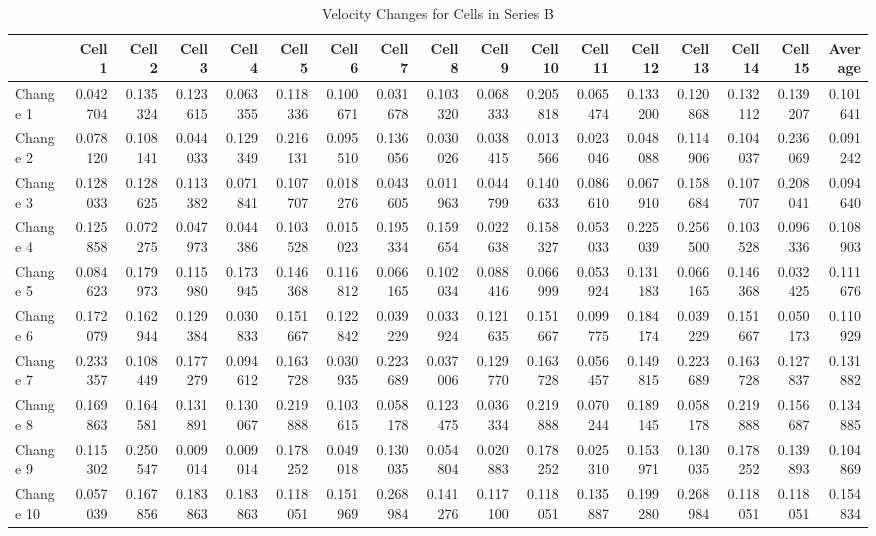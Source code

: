 \documentclass{article}
\begin{document}
\begin{landscape}
\begin{table}[htbp]
\centering
\caption{Velocity Changes for Cells in Series B}
\begin{tabular}{lrrrrrrrrrrrrrrrr}
\toprule
 & Cell 1 & Cell 2 & Cell 3 & Cell 4 & Cell 5 & Cell 6 & Cell 7 & Cell 8 & Cell 9 & Cell 10 & Cell 11 & Cell 12 & Cell 13 & Cell 14 & Cell 15 & Average \\
\midrule
Change 1 & 0.042704 & 0.135324 & 0.123615 & 0.063355 & 0.118336 & 0.100671 & 0.031678 & 0.103320 & 0.068333 & 0.205818 & 0.065474 & 0.133200 & 0.120868 & 0.132112 & 0.139207 & 0.101641 \\
Change 2 & 0.078120 & 0.108141 & 0.044033 & 0.129349 & 0.216131 & 0.095510 & 0.136056 & 0.030026 & 0.038415 & 0.013566 & 0.023046 & 0.048088 & 0.114906 & 0.104037 & 0.236069 & 0.091242 \\
Change 3 & 0.128033 & 0.128625 & 0.113382 & 0.071841 & 0.107707 & 0.018276 & 0.043605 & 0.011963 & 0.044799 & 0.140633 & 0.086610 & 0.067910 & 0.158684 & 0.107707 & 0.208041 & 0.094640 \\
Change 4 & 0.125858 & 0.072275 & 0.047973 & 0.044386 & 0.103528 & 0.015023 & 0.195334 & 0.159654 & 0.022638 & 0.158327 & 0.053033 & 0.225039 & 0.256500 & 0.103528 & 0.096336 & 0.108903 \\
Change 5 & 0.084623 & 0.179973 & 0.115980 & 0.173945 & 0.146368 & 0.116812 & 0.066165 & 0.102034 & 0.088416 & 0.066999 & 0.053924 & 0.131183 & 0.066165 & 0.146368 & 0.032425 & 0.111676 \\
Change 6 & 0.172079 & 0.162944 & 0.129384 & 0.030833 & 0.151667 & 0.122842 & 0.039229 & 0.033924 & 0.121635 & 0.151667 & 0.099775 & 0.184174 & 0.039229 & 0.151667 & 0.050173 & 0.110929 \\
Change 7 & 0.233357 & 0.108449 & 0.177279 & 0.094612 & 0.163728 & 0.030935 & 0.223689 & 0.037006 & 0.129770 & 0.163728 & 0.056457 & 0.149815 & 0.223689 & 0.163728 & 0.127837 & 0.131882 \\
Change 8 & 0.169863 & 0.164581 & 0.131891 & 0.130067 & 0.219888 & 0.103615 & 0.058178 & 0.123475 & 0.036334 & 0.219888 & 0.070244 & 0.189145 & 0.058178 & 0.219888 & 0.156687 & 0.134885 \\
Change 9 & 0.115302 & 0.250547 & 0.009014 & 0.009014 & 0.178252 & 0.049018 & 0.130035 & 0.054804 & 0.020883 & 0.178252 & 0.025310 & 0.153971 & 0.130035 & 0.178252 & 0.139893 & 0.104869 \\
Change 10 & 0.057039 & 0.167856 & 0.183863 & 0.183863 & 0.118051 & 0.151969 & 0.268984 & 0.141276 & 0.117100 & 0.118051 & 0.135887 & 0.199280 & 0.268984 & 0.118051 & 0.118051 & 0.154834 \\

\end{tabular}
\end{table}
\end{landscape}
\end{document}
